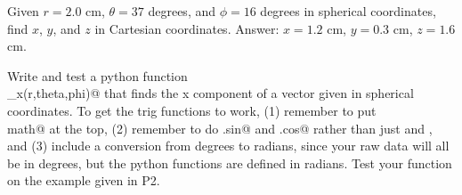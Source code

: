 \prelabquestion Given $r=2.0$ cm, $\theta=37$ degrees, and $\phi=16$ degrees in spherical coordinates, find $x$, $y$, and $z$
in Cartesian coordinates. Answer: $x=1.2$ cm, $y=0.3$ cm, $z=1.6$ cm.

\prelabquestion Write and test a python function \\
\verb@cart_x(r,theta,phi)@
that finds the x component of a vector given in spherical coordinates.
To get the trig functions to work, (1) remember to put\\
 \verb@import math@ at the top, (2) remember to do \verb@math.sin@
and \verb@math.cos@ rather than just \verb@sin@ and \verb@cos@, and (3) include a conversion from degrees to radians, since
your raw data will all be in degrees, but the python functions are defined in radians. Test your function on the example
given in P2.
